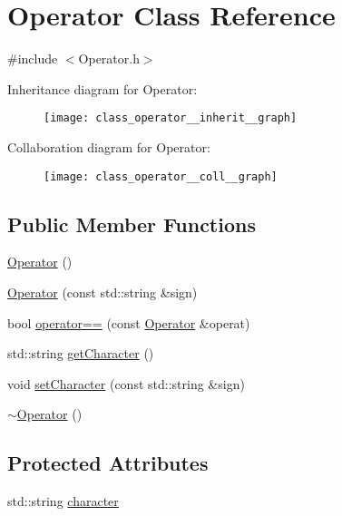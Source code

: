 \hypertarget{class_operator}{}\section{Operator Class Reference}
\label{class_operator}


{\ttfamily \#include $<$Operator.\+h$>$}



Inheritance diagram for Operator\+:
\nopagebreak
\begin{figure}[H]
\begin{center}
\leavevmode
\texttt{[image: class\_operator\_\_inherit\_\_graph]}
\end{center}
\end{figure}


Collaboration diagram for Operator\+:
\nopagebreak
\begin{figure}[H]
\begin{center}
\leavevmode
\texttt{[image: class\_operator\_\_coll\_\_graph]}
\end{center}
\end{figure}
\subsection*{Public Member Functions}
\begin{DoxyCompactItemize}
\item 
\mbox{\hyperlink{class_operator_acf2514c5e9f48b0a988c955a7d41c486}{Operator}} ()
\item 
\mbox{\hyperlink{class_operator_a335f2f54a53c02fbb7be1a09824c3827}{Operator}} (const std\+::string \&sign)
\item 
bool \mbox{\hyperlink{class_operator_abcd957826cbbf7c0f06cb1f7a7673d90}{operator==}} (const \mbox{\hyperlink{class_operator}{Operator}} \&operat)
\item 
std\+::string \mbox{\hyperlink{class_operator_a42b33776a8eebfcef38e079529c76de7}{get\+Character}} ()
\item 
void \mbox{\hyperlink{class_operator_a170fb2b4847b20ca2fc73d95ed2762e7}{set\+Character}} (const std\+::string \&sign)
\item 
\mbox{\hyperlink{class_operator_a2dedbf3c020736c8962f1d8d89f6cff3}{$\sim$\+Operator}} ()
\end{DoxyCompactItemize}
\subsection*{Protected Attributes}
\begin{DoxyCompactItemize}
\item 
std\+::string \mbox{\hyperlink{class_operator_a41e2e93ec8631a2366423aba34fe3cae}{character}}
\end{DoxyCompactItemize}


